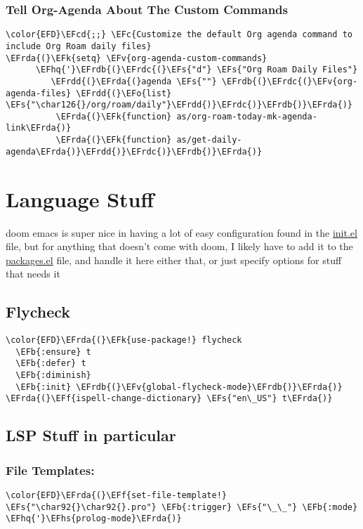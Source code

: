 \documentclass{article}
\newcommand{\EFc}[1]{\textcolor{EFc}{#1}} %
\newcommand{\EFcd}[1]{\textcolor{EFcd}{#1}} %
\newcommand{\EFs}[1]{\textcolor{EFs}{#1}} %
\newcommand{\EFk}[1]{\textcolor{EFk}{#1}} %
\newcommand{\EFb}[1]{\textcolor{EFb}{#1}} %
\newcommand{\EFf}[1]{\textcolor{EFf}{#1}} %
\newcommand{\EFv}[1]{\textcolor{EFv}{#1}} %
\newcommand{\EFo}[1]{\textcolor{EFo}{#1}} %
\newcommand{\EFhq}[1]{#1} %
\newcommand{\EFhs}[1]{\textcolor{EFhs}{#1}} %
\newcommand{\EFrda}[1]{\textcolor{EFrda}{#1}} %
\newcommand{\EFrdb}[1]{\textcolor{EFrdb}{#1}} %
\newcommand{\EFrdc}[1]{\textcolor{EFrdc}{#1}} %
\newcommand{\EFrdd}[1]{\textcolor{EFrdd}{#1}} %
\begin{document}
\subsubsection{Tell Org-Agenda About The Custom Commands}
\label{sec:orgc65c48d}
\begin{Code}
\begin{Verbatim}
\color{EFD}\EFcd{;;} \EFc{Customize the default Org agenda command to include Org Roam daily files}
\EFrda{(}\EFk{setq} \EFv{org-agenda-custom-commands}
      \EFhq{'}\EFrdb{(}\EFrdc{(}\EFs{"d"} \EFs{"Org Roam Daily Files"}
         \EFrdd{(}\EFrda{(}agenda \EFs{""} \EFrdb{(}\EFrdc{(}\EFv{org-agenda-files} \EFrdd{(}\EFo{list} \EFs{"\char126{}/org/roam/daily"}\EFrdd{)}\EFrdc{)}\EFrdb{)}\EFrda{)}
          \EFrda{(}\EFk{function} as/org-roam-today-mk-agenda-link\EFrda{)}
          \EFrda{(}\EFk{function} as/get-daily-agenda\EFrda{)}\EFrdd{)}\EFrdc{)}\EFrdb{)}\EFrda{)}
\end{Verbatim}
\end{Code}

\section{Language Stuff}
\label{sec:orge4965c2}
doom emacs is super nice in having a lot of easy configuration found in the \href{file:///home/liam/.config/doom/ init.el}{init.el} file, but for anything that doesn't come with doom, I likely have to add it to the \href{file:///home/liam/.config/doom/packages.el}{packages.el} file, and handle it here
either that, or just specify options for stuff that needs it
\subsection{Flycheck}
\label{sec:org975a904}
\begin{Code}
\begin{Verbatim}
\color{EFD}\EFrda{(}\EFk{use-package!} flycheck
  \EFb{:ensure} t
  \EFb{:defer} t
  \EFb{:diminish}
  \EFb{:init} \EFrdb{(}\EFv{global-flycheck-mode}\EFrdb{)}\EFrda{)}
\EFrda{(}\EFf{ispell-change-dictionary} \EFs{"en\_US"} t\EFrda{)}
\end{Verbatim}
\end{Code}
\subsection{LSP Stuff in particular}
\label{sec:org1dc5a7e}
\subsubsection{File Templates:}
\label{sec:org3aa883b}
\begin{Code}
\begin{Verbatim}
\color{EFD}\EFrda{(}\EFf{set-file-template!} \EFs{"\char92{}\char92{}.pro"} \EFb{:trigger} \EFs{"\_\_"} \EFb{:mode} \EFhq{'}\EFhs{prolog-mode}\EFrda{)}
\end{Verbatim}
\end{Code}
\end{document}
